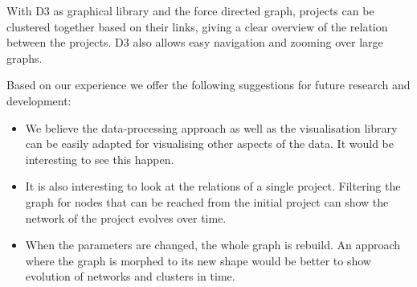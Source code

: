 \documentclass[10pt,a4paper]{article}
\begin{document}
With D3 as graphical library and the force directed graph, projects can be clustered together based on their links, giving a clear overview of the relation between the projects. D3 also allows easy navigation and zooming over large graphs.

Based on our experience we offer the following suggestions for future research and development:

\begin{itemize}
    \item We believe the data-processing approach as well as the visualisation library can be easily adapted for visualising other aspects of the data. It would be interesting to see this happen.
    \item It is also interesting to look at the relations of a single project. Filtering the graph for nodes that can be reached from the initial project can show the network of the project evolves over time.
    \item When the parameters are changed, the whole graph is rebuild. An approach where the graph is morphed to its new shape would be better to show evolution of networks and clusters in time.
\end{itemize}



\end{document}
